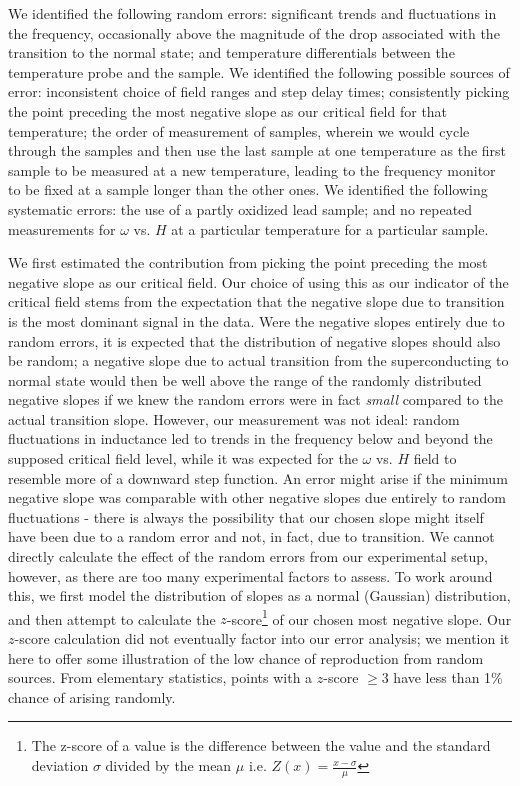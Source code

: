 \documentclass[aps,prl,nofootinbib,twocolumn,superscriptaddress,groupedaddress]{revtex4}  %
\begin{document}
We identified the following random errors: significant trends and fluctuations in the frequency, occasionally above the magnitude of the drop associated with the transition to the normal state; and temperature differentials between the temperature probe and the sample. We identified the following possible sources of error: inconsistent choice of field ranges and step delay times; consistently picking the point preceding the most negative slope as our critical field for that temperature; the order of measurement of samples, wherein we would cycle through the samples and then use the last sample at one temperature as the first sample to be measured at a new temperature, leading to the frequency monitor to be fixed at a sample longer than the other ones. We identified the following systematic errors: the use of a partly oxidized lead sample; and no repeated measurements for $\omega$ vs. $H$ at a particular temperature for a particular sample.

We first estimated the contribution from picking the point preceding the most negative slope as our critical field. Our choice of using this as our indicator of the critical field stems from the expectation that the negative slope due to transition is the most dominant signal in the data. Were the negative slopes entirely due to random errors, it is expected that the distribution of negative slopes should also be random; a negative slope due to actual transition from the superconducting to normal state would then be well above the range of the randomly distributed negative slopes if we knew the random errors were in fact \textit{small} compared to the actual transition slope. However, our measurement was not ideal: random fluctuations in inductance led to trends in the frequency below and beyond the supposed critical field level, while it was expected for the $\omega$ vs. $H$ field to resemble more of a downward step function. An error might arise if the minimum negative slope was comparable with other negative slopes due entirely to random fluctuations - there is always the possibility that our chosen slope might itself have been due to a random error and not, in fact, due to transition. We cannot directly calculate the effect of the random errors from our experimental setup, however, as there are too many experimental factors to assess. To work around this, we first model the distribution of slopes as a normal (Gaussian) distribution, and then attempt to calculate the $z$-score\footnote{The z-score of a value is the difference between the value and the standard deviation $\sigma$ divided by the mean $\mu$ i.e. $Z(x) = \frac{x - \sigma}{\mu}$} of our chosen most negative slope. Our $z$-score calculation did not eventually factor into our error analysis; we mention it here to offer some illustration of the low chance of reproduction from random sources. From elementary statistics, points with a $z$-score $ \geq 3$ have less than 1\% chance of arising randomly. 
\end{document}
